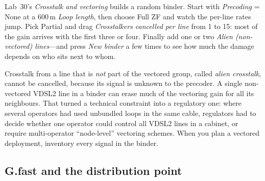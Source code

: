 \begin{tryit}
Lab~30's \emph{Crosstalk and vectoring} builds a random binder. Start with \emph{Precoding} =
None at a 600\,m \emph{Loop length}, then choose Full ZF and watch the per-line rates jump. Pick
Partial and drag \emph{Crosstalkers cancelled per line} from 1 to 15: most of the gain arrives with
the first three or four. Finally add one or two \emph{Alien (non-vectored) lines}---and press
\emph{New binder} a few times to see how much the damage depends on who sits next to whom.
\end{tryit}


\begin{pitfall}
Crosstalk from a line that is \emph{not} part of the vectored group, called \emph{alien crosstalk},
cannot be cancelled, because its signal is unknown to the precoder. A single non-vectored VDSL2 line in a
binder can erase much of the vectoring gain for all its neighbours. That turned a technical constraint
into a regulatory one: where several operators had used unbundled loops in the same cable, regulators
had to decide whether one operator could control all VDSL2 lines in a cabinet, or require
multi-operator ``node-level'' vectoring schemes. When you plan a vectored deployment, inventory every
signal in the binder.
\end{pitfall}

\subsection{G.fast and the distribution point}
\label{sec:ch24:gfast}

